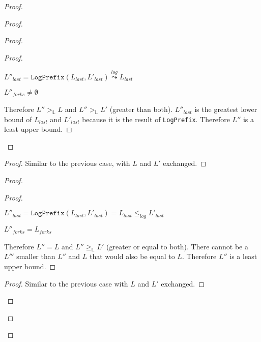 \documentclass[9pt, oneside]{article}   	%
\newcommand{\logleadsto}{\overset{\textit{log}}\leadsto}
\begin{document}
\begin{proof}
\begin{proof}
\begin{proof}
			\begin{proof}
				\begin{pfenum}
					\item $L''_\textit{last} = \texttt{LogPrefix}(L_\textit{last}, L'_\textit{last}) \logleadsto L_\textit{last} $ 
					\item $L''_\textit{forks} \neq \emptyset$
				\end{pfenum}
				Therefore $L'' >_\mathds{L} L$ and $L'' >_\mathds{L} L'$ (greater than both). $L''_\textit{last}$ is the greatest lower bound of $L_\textit{last}$ and $L'_\textit{last}$ because it is the result of \texttt{LogPrefix}. Therefore $L''$ is a least upper bound.
			\end{proof}
		\end{proof}
		
		\begin{proof}
			Similar to the previous case, with $L$ and $L'$ exchanged.
		\end{proof}
		
		\begin{proof}
			\begin{proof}
				\begin{pfenum}
					\item $L''_\textit{last} = \texttt{LogPrefix}(L_\textit{last}, L'_\textit{last}) = L_\textit{last} \leq_\textit{log} L'_\textit{last}$ 
					\item $L''_\textit{forks} = L_\textit{forks}$
				\end{pfenum}
				Therefore $L'' = L$ and $L'' \geq_\mathds{L} L'$ (greater or equal to both). There cannot be a $L'''$ smaller than $L''$ and $L$ that would also be equal to $L$. Therefore $L''$ is a least upper bound.
			\end{proof}
			
			\begin{proof}
				Similar to the previous case with $L$ and $L'$ exchanged.
			\end{proof}
			

\end{proof}
\end{proof}
\end{proof}
\end{document}
